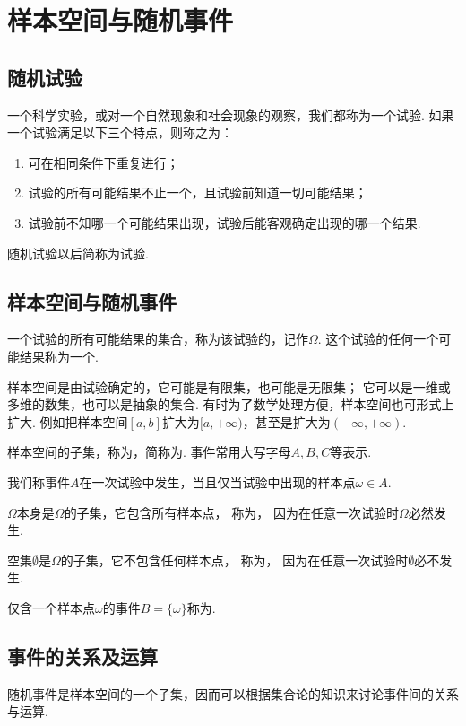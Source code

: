 \section{样本空间与随机事件}
\subsection{随机试验}
\begin{definition}
一个科学实验，或对一个自然现象和社会现象的观察，我们都称为一个试验.
如果一个试验满足以下三个特点，则称之为：
\begin{enumerate}
	\item 可在相同条件下重复进行；
	\item 试验的所有可能结果不止一个，且试验前知道一切可能结果；
	\item 试验前不知哪一个可能结果出现，试验后能客观确定出现的哪一个结果.
\end{enumerate}
\end{definition}
随机试验以后简称为试验.

\subsection{样本空间与随机事件}
一个试验的所有可能结果的集合，称为该试验的，记作\(\Omega\).
这个试验的任何一个可能结果称为一个.

样本空间是由试验确定的，它可能是有限集，也可能是无限集；
它可以是一维或多维的数集，也可以是抽象的集合.
有时为了数学处理方便，样本空间也可形式上扩大.
例如把样本空间\([a,b]\)扩大为\([a,+\infty)\)，甚至是扩大为\((-\infty,+\infty)\).

样本空间的子集，称为，简称为.
事件常用大写字母\(A,B,C\)等表示.

我们称事件\(A\)在一次试验中发生，当且仅当试验中出现的样本点\(\omega \in A\).

\(\Omega\)本身是\(\Omega\)的子集，它包含所有样本点，
称为，
因为在任意一次试验时\(\Omega\)必然发生.

空集\(\emptyset\)是\(\Omega\)的子集，它不包含任何样本点，
称为，
因为在任意一次试验时\(\emptyset\)必不发生.

仅含一个样本点\(\omega\)的事件\(B = \{\omega\}\)称为.

\subsection{事件的关系及运算}
随机事件是样本空间的一个子集，因而可以根据集合论的知识来讨论事件间的关系与运算.

